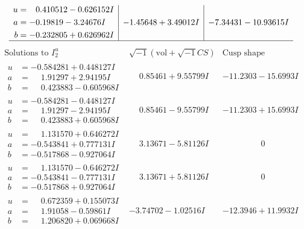 \documentclass[1p]{elsarticle_modified}
\theoremstyle{definition}
\newcommand{\I}{\sqrt{-1}}
\begin{document}
$$\begin{array}{c|c|c}
\begin{aligned}
u &= \phantom{-}0.410512 - 0.626152 I \\
a &= -0.19819 - 3.24676 I \\
b &= -0.232805 + 0.626962 I\end{aligned}
 & -1.45648 + 3.49012 I & -7.34431 - 10.93615 I\\
 \hline 
 \end{array}$$\newpage$$\begin{array}{c|c|c}  
\text{Solutions to }I^u_{2}& \I (\text{vol} + \sqrt{-1}CS) & \text{Cusp shape}\\
 \hline 
\begin{aligned}
u &= -0.584281 + 0.448127 I \\
a &= \phantom{-}1.91297 + 2.94195 I \\
b &= \phantom{-}0.423883 - 0.605968 I\end{aligned}
 & \phantom{-}0.85461 + 9.55799 I & -11.2303 - 15.6993 I \\ \hline\begin{aligned}
u &= -0.584281 - 0.448127 I \\
a &= \phantom{-}1.91297 - 2.94195 I \\
b &= \phantom{-}0.423883 + 0.605968 I\end{aligned}
 & \phantom{-}0.85461 - 9.55799 I & -11.2303 + 15.6993 I \\ \hline\begin{aligned}
u &= \phantom{-}1.131570 + 0.646272 I \\
a &= -0.543841 + 0.777131 I \\
b &= -0.517868 - 0.927064 I\end{aligned}
 & \phantom{-}3.13671 - 5.81126 I & \phantom{-0.000000 } 0 \\ \hline\begin{aligned}
u &= \phantom{-}1.131570 - 0.646272 I \\
a &= -0.543841 - 0.777131 I \\
b &= -0.517868 + 0.927064 I\end{aligned}
 & \phantom{-}3.13671 + 5.81126 I & \phantom{-0.000000 } 0 \\ \hline\begin{aligned}
u &= \phantom{-}0.672359 + 0.155073 I \\
a &= \phantom{-}1.91058 - 0.59861 I \\
b &= \phantom{-}1.206820 + 0.069668 I\end{aligned}
 & -3.74702 - 1.02516 I & -12.3946 + 11.9932 I \\ \hline\begin{aligned}

\end{aligned}
\end{array}$$
\end{document}
